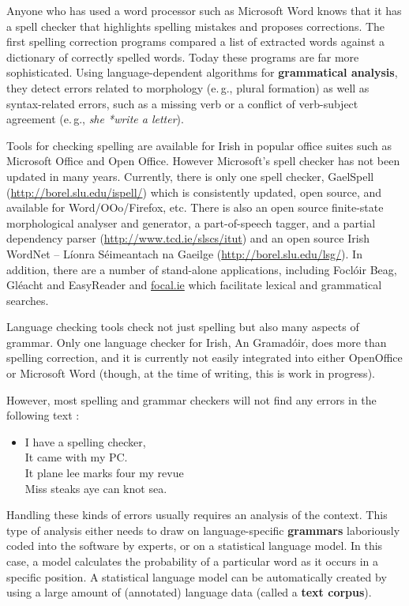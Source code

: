 \begin{multicols}{2}
Anyone who has used a word processor such as Microsoft Word knows that it has a spell checker that highlights spelling mistakes and proposes corrections. The first spelling correction programs compared a list of extracted words against a dictionary of correctly spelled words. Today these programs are far more sophisticated. Using language-dependent algorithms for \textbf{grammatical analysis}, they detect errors related to morphology (e.\,g., plural formation) as well as syntax-related errors, such as a missing verb or a conflict of verb-subject agreement (e.\,g., \textit{she *write a letter}). 

Tools for checking spelling are available for Irish in popular office suites such as Microsoft Office and Open Office. However Microsoft's spell checker has not been updated in many years. Currently, there is only one spell checker, GaelSpell (\url{http://borel.slu.edu/ispell/}) which is consistently updated, open source, and available for Word/OOo/Firefox, etc. There is also an open source finite-state morphological analyser and generator, a part-of-speech tagger, and a partial dependency parser (\url{http://www.tcd.ie/slscs/itut}) and an open source Irish WordNet -- Líonra Séimeantach na Gaeilge  (\url{http://borel.slu.edu/lsg/}). In addition, there are a number of stand-alone applications, including Foclóir Beag, Gléacht and EasyReader and \url{focal.ie} which facilitate lexical and grammatical searches. 

Language checking tools check not just spelling but also many aspects of grammar. Only one language checker for Irish, An Gramadóir,  \cite{gramadoir} does more than spelling correction, and it is currently not easily integrated into either OpenOffice or Microsoft Word (though, at the time of writing, this is work in progress).

However, most spelling and grammar checkers will not find any errors in the following text \cite{zar1}:

\begin{itemize}
\item[] I have a spelling checker,\\
  It came with my PC.\\
  It plane lee marks four my revue\\
  Miss steaks aye can knot sea.
\end{itemize}

Handling these kinds of errors usually requires an analysis of the context. This type of analysis either needs to draw on language-specific \textbf{grammars} laboriously coded into the software by experts, or on a statistical language model. In this case, a model calculates the probability of a particular word as it occurs in a specific position. A statistical language model can be automatically created by using a large amount of (annotated) language data (called a \textbf{text corpus}). 


\end{multicols}
